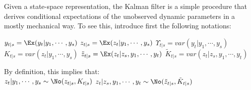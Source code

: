 \begin{table}[H] \centering
{}
\captionsetup{justification=centering}
\caption{State-space representations for the dynamic parameters}
\label{tbapp1_1} \vspace{-2mm}
\end{table}

Given a state-space representation, the Kalman filter is a simple procedure that derives conditional expectations of the unobserved dynamic parameters in a mostly mechanical way. To see this, introduce first the following notations:

$y_{t|s}=\Ex(y_t|y_1,\cdots,y_s)$ \hspace{10mm} $z_{t|s}=\Ex(z_t|y_1,\cdots,y_s)$ \hspace{10mm} $\Upsilon_{t|s}=var(y_t|y_1,\cdots,y_s)$ \\
$K_{t|s}=var(z_t|y_1,\cdots,y_s)$ \hspace{6mm} $\tilde{z}_{t|s}=\Ex(z_t|z_s, y_1,\cdots,y_t)$ \hspace{5.5mm} $\tilde{K}_{t|s}=var(z_t|z_s, y_1,\cdots,y_t)$

By definition, this implies that: \\
$z_t|y_1,\cdots,y_s \sim \No (z_{t|s},K_{t|s})$ \hspace{5mm} $z_t|z_s, y_1,\cdots,y_t \sim \No (\tilde{z}_{t|s},\tilde{K}_{t|s})$

